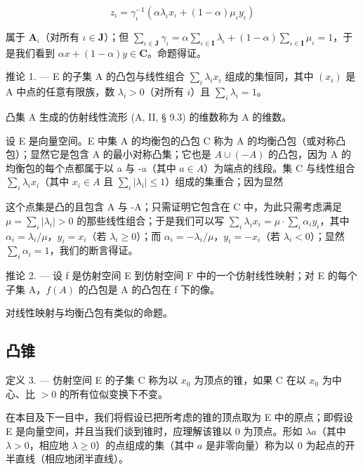 \[
z _ {\iota} = \gamma_ {\iota} ^ {- 1} (\alpha \lambda_ {\iota} x _ {\iota} + (1 - \alpha) \mu_ {\iota} y _ {\iota})
\]

属于 \(\mathbf{A}_{\iota}\)（对所有 \(\iota \in \mathbf{J}\)）；但 \(\sum_{\iota \in \mathbf{J}} \gamma_{\iota} = \alpha \sum_{\iota \in \mathbf{I}} \lambda_{\iota} + (1 - \alpha) \sum_{\iota \in \mathbf{I}} \mu_{\iota} = 1\)，于是我们看到 \(\alpha x + (1 - \alpha)y \in \mathbf{C}\)。命题得证。

推论 1. --- E 的子集 A 的凸包与线性组合 \(\sum_{i} \lambda_{i} x_{i}\) 组成的集恒同，其中 \((x_{i})\) 是 A 中点的任意有限族，数 \(\lambda_{i} > 0\)（对所有 \(i\)）且 \(\sum_{i} \lambda_{i} = 1\)。

凸集 A 生成的仿射线性流形 (A, II, § 9.3) 的维数称为 A 的维数。

设 E 是向量空间。E 中集 A 的均衡包的凸包 C 称为 A 的均衡凸包（或对称凸包）；显然它是包含 A 的最小对称凸集；它也是 \(A \cup (-A)\) 的凸包，因为 A 的均衡包的每个点都属于以 a 与 -a（其中 \(a \in A\)）为端点的线段。集 C 与线性组合 \(\sum_{i} \lambda_{i} x_{i}\)（其中 \(x_{i} \in A\) 且 \(\sum_{i} |\lambda_{i}| \leqslant 1\)）组成的集重合；因为显然

这个点集是凸的且包含 A 与 -A；只需证明它包含在 C 中，为此只需考虑满足 \(\mu = \sum_{i} |\lambda_{i}| > 0\) 的那些线性组合；于是我们可以写 \(\sum_{i} \lambda_{i} x_{i} = \mu \cdot \sum_{i} \alpha_{i} y_{i}\)，其中 \(\alpha_{i} = \lambda_{i} / \mu\)，\(y_{i} = x_{i}\)（若 \(\lambda_{i} \geqslant 0\)）；而 \(\alpha_{i} = -\lambda_{i} / \mu\)，\(y_{i} = -x_{i}\)（若 \(\lambda_{i} < 0\)）；显然 \(\sum_{i} \alpha_{i} = 1\)，我们的断言得证。

推论 2. --- 设 f 是仿射空间 E 到仿射空间 F 中的一个仿射线性映射；对 E 的每个子集 A，\(f(A)\) 的凸包是 A 的凸包在 f 下的像。

对线性映射与均衡凸包有类似的命题。

\subsection{凸锥}

定义 3. --- 仿射空间 E 的子集 C 称为以 \(x_0\) 为顶点的锥，如果 C 在以 \(x_0\) 为中心、比 \(> 0\) 的所有位似变换下不变。

在本目及下一目中，我们将假设已把所考虑的锥的顶点取为 E 中的原点；即假设 E 是向量空间，并且当我们谈到锥时，应理解该锥以 0 为顶点。形如 \(\lambda a\)（其中 \(\lambda > 0\)，相应地 \(\lambda \geqslant 0\)）的点组成的集（其中 \(a\) 是非零向量）称为以 0 为起点的开半直线（相应地闭半直线）。

